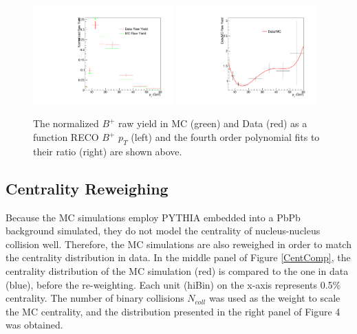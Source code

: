 \begin{figure}[h]
\begin{center}
\includegraphics[width= 0.48\textwidth]{Figures/Chapter5/BPBptDataMC1.pdf}
\includegraphics[width= 0.48\textwidth]{Figures/Chapter5/BPBptDataMC2.pdf}
\caption{The normalized $B^+$ raw yield in MC (green) and Data (red) as a function RECO $B^+$ $p_T$ (left) and the fourth order polynomial fits to their ratio (right) are shown above.}
\label{BPBptWeight}
\end{center}
\end{figure}


\subsection{Centrality Reweighing}

Because the MC simulations employ PYTHIA embedded into a PbPb background simulated, they do not model the centrality of nucleus-nucleus collision well. Therefore, the MC simulations are also reweighed in order to match the centrality distribution in data. In the middle panel of Figure \ref{CentComp}, the centrality distribution of the MC simulation (red) is compared to the one in data (blue), before the re-weighting. Each unit (hiBin) on the x-axis represents 0.5\% centrality. The number of binary collisions $N_{coll}$ was used as the weight to scale the MC centrality, and the distribution presented in the right panel of Figure 4 was obtained. 


